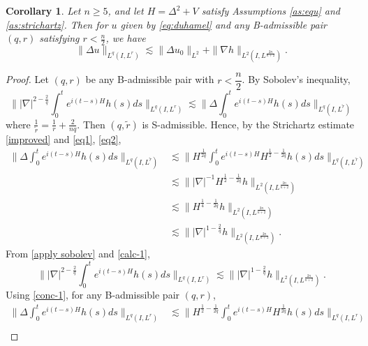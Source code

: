 \documentclass[11pt,a4paper]{article}
\numberwithin{equation}{section}
\newtheorem{corollary}[theorem]{Corollary}
\begin{document}
\begin{corollary}\label{sobolev stricartz}
Let $n \geq 5$, and let $H = \Delta^{2} + V$ satisfy Assumptions \ref{as:equ} and \ref{as:strichartz}. Then for $u$ given by \eqref{eq:duhamel} and any B-admissible pair $(q, r)$ satisfying $r < \frac{n}{2}$, we have
\begin{equation}\label{strichartz}
\|\Delta u\|_{L^{q}(I, L^{r})} \lesssim \|\Delta u_{0}\|_{L^{2}} + \|\nabla h\|_{L^{2}(I, L^{\frac{2n}{n + 2}})}.
\end{equation}
\end{corollary}

\begin{proof}
Let $(q, r)$ be any B-admissible pair with $r < \dfrac{n}{2}$. By Sobolev's inequality,
\begin{equation}\label{apply sobolev}
\||\nabla|^{2 - \frac{2}{q}} \int_{0}^{t} e^{i(t - s)H}h(s) ds\|_{L^{q}(I, L^{r})} \lesssim \|\Delta \int_{0}^{t} e^{i(t - s)H}h(s) ds\|_{L^{q}(I, L^{\tilde{r}})}
\end{equation}
where $\frac{1}{\tilde{r}} = \frac{1}{r} + \frac{2}{nq}$. Then $(q, \tilde{r})$ is S-admissible. Hence, by the Strichartz estimate \eqref{improved} and \eqref{eq1}, \eqref{eq2},
\begin{equation}
\begin{aligned}\label{calc-1}
\|\Delta \int_{0}^{t} e^{i(t - s)H}h(s) ds\|_{L^{q}(I, L^{\tilde{r}})} &\lesssim \| H^{\frac{1}{2q}}\int_{0}^{t} e^{i(t - s)H}H^{\frac{1}{2} - \frac{1}{2q}}h(s) ds\|_{L^{q}(I, L^{\tilde{r}})} \\
&\lesssim \||\nabla|^{-1}H^{\frac{1}{2} - \frac{1}{2q}}h\|_{L^{2}(I, L^{\frac{2n}{n + 2}})} \\
&\lesssim \|H^{\frac{1}{4} - \frac{1}{2q}}h\|_{L^{2}(I, L^{\frac{2n}{n + 2}})} \\
&\lesssim \||\nabla|^{1 - \frac{2}{q}} h\|_{L^{2}(I, L^{\frac{2n}{n + 2}})}.
\end{aligned}
\end{equation}
From \eqref{apply sobolev} and \eqref{calc-1},
\begin{equation}\label{conc-1}
\||\nabla|^{2 - \frac{2}{q}} \int_{0}^{t} e^{i(t - s)H}h(s) ds\|_{L^{q}(I, L^{r})} \lesssim \||\nabla|^{1 - \frac{2}{q}} h\|_{L^{2}(I, L^{\frac{2n}{n + 2}})}.
\end{equation}
Using \eqref{conc-1}, for any B-admissible pair $(q, r)$,
\begin{equation}
\begin{aligned}\label{inhomogeneous}
\|\Delta \int_{0}^{t} e^{i(t - s)H}h(s) ds\|_{L^{q}(I, L^{r})} &\lesssim \|H^{\frac{1}{2} - \frac{1}{2q}} \int_{0}^{t} e^{i(t - s)H}H^{\frac{1}{2q}}h(s) ds\|_{L^{q}(I, L^{r})} \\

\end{aligned}
\end{equation}
\end{proof}
\end{document}

